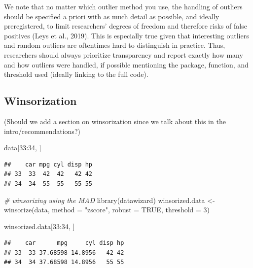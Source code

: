 \documentclass[
]{article}
\newenvironment{Shaded}{\begin{snugshade}}{\end{snugshade}}
\newcommand{\AttributeTok}[1]{\textcolor[rgb]{0.77,0.63,0.00}{#1}}
\newcommand{\CommentTok}[1]{\textcolor[rgb]{0.56,0.35,0.01}{\textit{#1}}}
\newcommand{\ConstantTok}[1]{\textcolor[rgb]{0.00,0.00,0.00}{#1}}
\newcommand{\DecValTok}[1]{\textcolor[rgb]{0.00,0.00,0.81}{#1}}
\newcommand{\FunctionTok}[1]{\textcolor[rgb]{0.00,0.00,0.00}{#1}}
\newcommand{\NormalTok}[1]{#1}
\newcommand{\OtherTok}[1]{\textcolor[rgb]{0.56,0.35,0.01}{#1}}
\newcommand{\SpecialCharTok}[1]{\textcolor[rgb]{0.00,0.00,0.00}{#1}}
\newcommand{\StringTok}[1]{\textcolor[rgb]{0.31,0.60,0.02}{#1}}
\begin{document}
We note that no matter which outlier method you use, the handling of
outliers should be specified a priori with as much detail as possible,
and ideally preregistered, to limit researchers' degrees of freedom and
therefore risks of false positives (Leys et al., 2019). This is
especially true given that interesting outliers and random outliers are
oftentimes hard to distinguish in practice. Thus, researchers should
always prioritize transparency and report exactly how many and how
outliers were handled, if possible mentioning the package, function, and
threshold used (ideally linking to the full code).

\hypertarget{winsorization}{%
\subsection{Winsorization}\label{winsorization}}

(Should we add a section on winsorization since we talk about this in
the intro/recommendations?)

\begin{Shaded}
\begin{Highlighting}[]
\NormalTok{data[}\DecValTok{33}\SpecialCharTok{:}\DecValTok{34}\NormalTok{, ]}
\end{Highlighting}
\end{Shaded}

\begin{verbatim}
##    car mpg cyl disp hp
## 33  33  42  42   42 42
## 34  34  55  55   55 55
\end{verbatim}

\begin{Shaded}
\begin{Highlighting}[]
\CommentTok{\# winsorizing using the MAD}
\FunctionTok{library}\NormalTok{(datawizard)}
\NormalTok{winsorized.data }\OtherTok{\textless{}{-}} \FunctionTok{winsorize}\NormalTok{(data, }\AttributeTok{method =} \StringTok{"zscore"}\NormalTok{, }\AttributeTok{robust =} \ConstantTok{TRUE}\NormalTok{, }\AttributeTok{threshold =} \DecValTok{3}\NormalTok{)}

\NormalTok{winsorized.data[}\DecValTok{33}\SpecialCharTok{:}\DecValTok{34}\NormalTok{, ]}
\end{Highlighting}
\end{Shaded}

\begin{verbatim}
##    car      mpg     cyl disp hp
## 33  33 37.68598 14.8956   42 42
## 34  34 37.68598 14.8956   55 55
\end{verbatim}
\end{document}
